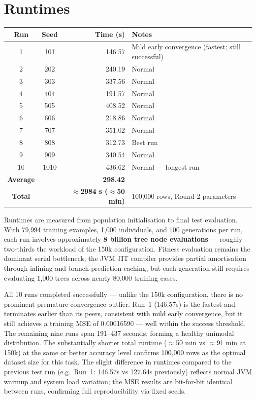 \documentclass[12pt,a4paper]{article}
\begin{document}
\section{Runtimes}

\begin{center}
\begin{tabular}{ccrl}
\toprule
\textbf{Run} & \textbf{Seed} & \textbf{Time (s)} & \textbf{Notes} \\
\midrule
1  & 101  & 146.57 & Mild early convergence (fastest; still successful) \\
2  & 202  & 240.19 & Normal \\
3  & 303  & 337.56 & Normal \\
4  & 404  & 191.57 & Normal \\
5  & 505  & 408.52 & Normal \\
6  & 606  & 218.86 & Normal \\
7  & 707  & 351.02 & Normal \\
8  & 808  & 312.73 & Best run \\
9  & 909  & 340.54 & Normal \\
10 & 1010 & 436.62 & Normal --- longest run \\
\midrule
\textbf{Average} & & \textbf{298.42} & \\
\textbf{Total}   & & \textbf{$\approx$2984 s ($\approx$50 min)} & 100,000 rows, Round 2 parameters \\
\bottomrule
\end{tabular}
\end{center}

Runtimes are measured from population initialisation to final test evaluation. With 79,994 training examples, 1,000 individuals, and 100 generations per run, each run involves approximately \textbf{8 billion tree node evaluations} --- roughly two-thirds the workload of the 150k configuration. Fitness evaluation remains the dominant serial bottleneck; the JVM JIT compiler provides partial amortisation through inlining and branch-prediction caching, but each generation still requires evaluating 1,000 trees across nearly 80,000 training cases.

All 10 runs completed successfully --- unlike the 150k configuration, there is no prominent premature-convergence outlier. Run~1 (146.57s) is the fastest and terminates earlier than its peers, consistent with mild early convergence, but it still achieves a training MSE of 0.00016590 --- well within the success threshold. The remaining nine runs span 191--437 seconds, forming a healthy unimodal distribution. The substantially shorter total runtime ($\approx$50 min vs $\approx$91 min at 150k) at the same or better accuracy level confirms 100,000 rows as the optimal dataset size for this task. The slight difference in runtimes compared to the previous test run (e.g.\ Run~1: 146.57s vs 127.64s previously) reflects normal JVM warmup and system load variation; the MSE results are bit-for-bit identical between runs, confirming full reproducibility via fixed seeds.
\end{document}
